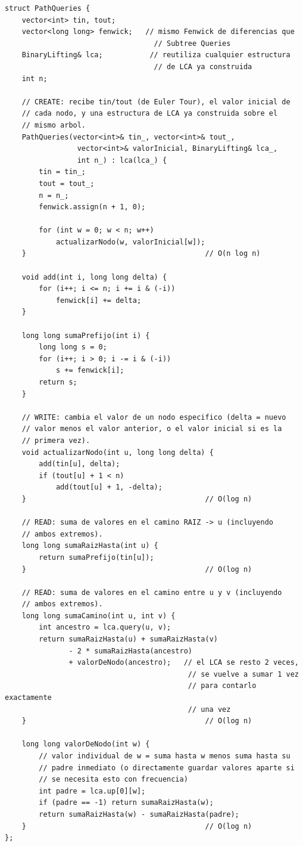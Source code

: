 \documentclass[10pt,a4paper,twocolumn]{article}
\begin{document}
\begin{lstlisting}[style=cpp]
struct PathQueries {
    vector<int> tin, tout;
    vector<long long> fenwick;   // mismo Fenwick de diferencias que
                                   // Subtree Queries
    BinaryLifting& lca;           // reutiliza cualquier estructura
                                   // de LCA ya construida
    int n;

    // CREATE: recibe tin/tout (de Euler Tour), el valor inicial de
    // cada nodo, y una estructura de LCA ya construida sobre el
    // mismo arbol.
    PathQueries(vector<int>& tin_, vector<int>& tout_,
                 vector<int>& valorInicial, BinaryLifting& lca_,
                 int n_) : lca(lca_) {
        tin = tin_;
        tout = tout_;
        n = n_;
        fenwick.assign(n + 1, 0);

        for (int w = 0; w < n; w++)
            actualizarNodo(w, valorInicial[w]);
    }                                          // O(n log n)

    void add(int i, long long delta) {
        for (i++; i <= n; i += i & (-i))
            fenwick[i] += delta;
    }

    long long sumaPrefijo(int i) {
        long long s = 0;
        for (i++; i > 0; i -= i & (-i))
            s += fenwick[i];
        return s;
    }

    // WRITE: cambia el valor de un nodo especifico (delta = nuevo
    // valor menos el valor anterior, o el valor inicial si es la
    // primera vez).
    void actualizarNodo(int u, long long delta) {
        add(tin[u], delta);
        if (tout[u] + 1 < n)
            add(tout[u] + 1, -delta);
    }                                          // O(log n)

    // READ: suma de valores en el camino RAIZ -> u (incluyendo
    // ambos extremos).
    long long sumaRaizHasta(int u) {
        return sumaPrefijo(tin[u]);
    }                                          // O(log n)

    // READ: suma de valores en el camino entre u y v (incluyendo
    // ambos extremos).
    long long sumaCamino(int u, int v) {
        int ancestro = lca.query(u, v);
        return sumaRaizHasta(u) + sumaRaizHasta(v)
               - 2 * sumaRaizHasta(ancestro)
               + valorDeNodo(ancestro);   // el LCA se resto 2 veces,
                                           // se vuelve a sumar 1 vez
                                           // para contarlo exactamente
                                           // una vez
    }                                          // O(log n)

    long long valorDeNodo(int w) {
        // valor individual de w = suma hasta w menos suma hasta su
        // padre inmediato (o directamente guardar valores aparte si
        // se necesita esto con frecuencia)
        int padre = lca.up[0][w];
        if (padre == -1) return sumaRaizHasta(w);
        return sumaRaizHasta(w) - sumaRaizHasta(padre);
    }                                          // O(log n)
};
\end{lstlisting}
\end{document}
